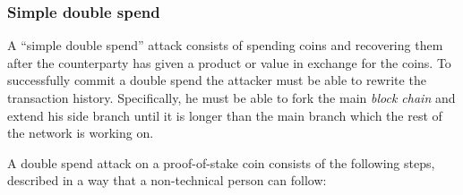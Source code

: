 \documentclass[a4paper,11pt]{article}
\begin{document}
\subsubsection{Simple double spend}
\label{331}

A ``simple double spend'' attack consists of spending coins and recovering them after the counterparty has given a product or value in exchange for the coins. To successfully commit a double spend the attacker must be able to rewrite the transaction history. Specifically, he must be able to fork the main \textit{block chain} and extend his side branch until it is longer than the main branch which the rest of the network is working on.

A double spend attack on a proof-of-stake coin consists of the following steps, described in a way that a non-technical person can follow:
\end{document}
